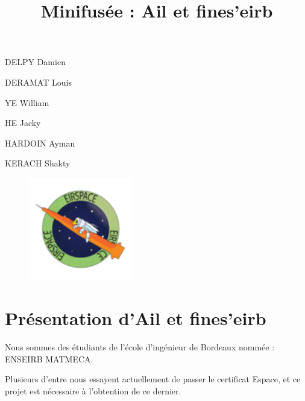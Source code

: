 \documentclass[48pt]{article}
\date{}
\begin{document}
\title{\Huge Minifusée : Ail et fines'eirb}
\maketitle

\pagestyle{plain}

\vspace{4\baselineskip}

\begin{center}
	\Large DELPY Damien

	\Large DERAMAT Louis

	\Large YE William

	\Large HE Jacky

	\Large HARDOIN Ayman

	\Large KERACH Shakty
\end{center}

\begin{figure}
	\begin{center}
		\includegraphics[width=0.4\textwidth]{pics/eirspace.png}	
	\end{center}
\end{figure}


\newpage

\section{\centering \Large Présentation d'Ail et fines'eirb}

\vspace{2\baselineskip}

Nous sommes des étudiants de l'école d'ingénieur de Bordeaux nommée : \centering ENSEIRB MATMECA.

\vspace{2\baselineskip}

Plusieurs d'entre nous essayent actuellement de passer le certificat Espace, et ce projet est nécessaire à l'obtention de ce dernier.
\end{document}

